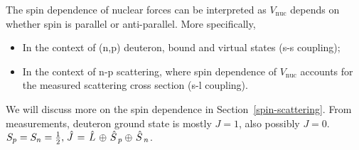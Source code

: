 \documentclass{school-22.101-notes}
\begin{document}
The spin dependence of nuclear forces can be interpreted as $V_{\mathrm{nuc}}$ depends on whether spin is parallel or anti-parallel. More specifically, 
\begin{itemize}
    \item In the context of (n,p) deuteron, bound and virtual states (s-s coupling);
    \item In the context of n-p scattering, where spin dependence of $V_{\mathrm{nuc}}$ accounts for the measured scattering cross section (s-l coupling). 
\end{itemize}


 We will discuss more on the spin dependence in Section~\ref{spin-scattering}. 
From measurements, deuteron ground state is mostly $J=1$, also possibly $J=0$.  $S_p = S_n = \frac{1}{2}, \left. \hat{J} \right. = \left. \hat{L} \right. \oplus \left. \hat{S} \right._p \oplus \left. \hat{S} \right._n$.
\end{document}
